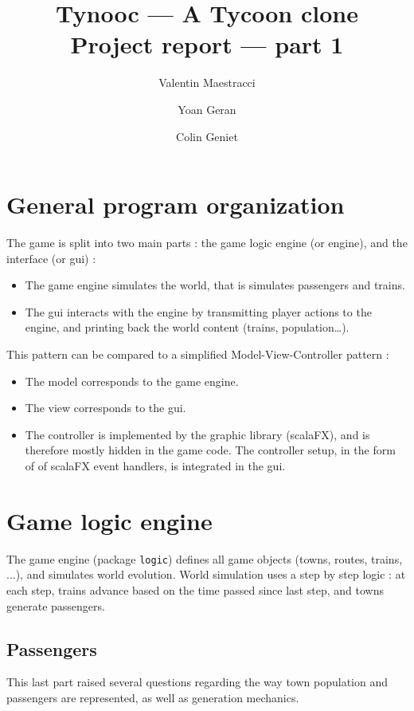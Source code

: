 \documentclass{article}
\begin{document}
\title{Tynooc --- A Tycoon clone \\ \large{Project report --- part 1}}
\author{Valentin Maestracci \and Yoan Geran \and Colin Geniet}
\maketitle

\tableofcontents

\section{General program organization}
The game is split into two main parts : the game logic engine (or engine), and the interface (or gui) :
\begin{itemize}
\item The game engine simulates the world, that is simulates passengers and trains.
\item The gui interacts with the engine by transmitting player actions to the engine, 
and printing back the world content (trains, population\dots).
\end{itemize}

This pattern can be compared to a simplified Model-View-Controller pattern :
\begin{itemize}[noitemsep]
\item The model corresponds to the game engine.
\item The view corresponds to the gui.
\item The controller is implemented by the graphic library (scalaFX), and is therefore mostly hidden in the game code.
The controller setup, in the form of of scalaFX event handlers, is integrated in the gui.
\end{itemize}



\section{Game logic engine}
The game engine (package \verb|logic|) defines all game objects (towns, routes, trains, ...), and simulates world evolution.
World simulation uses a step by step logic : at each step, trains advance based on the time passed since last step,
and towns generate passengers.

\subsection{Passengers}
This last part raised several questions regarding the way town population and passengers are represented,
as well as generation mechanics.
\end{document}
